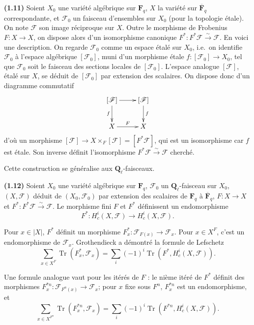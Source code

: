 \documentclass[12pt,a4paper]{amsart}
\theoremstyle{plain}
\theoremstyle{definition}
\theoremstyle{remark}
\DeclareMathOperator{\Tr}{Tr}
\newcommand{\Q}{\mathbf{Q}}
\newcommand{\F}{\mathbf{F}}
\numberwithin{equation}{section}
\begin{document}
\noindent \textbf{(1.11)} Soient $X_0$ une vari\'et\'e alg\'ebrique sur $\F_q$, $X$ la vari\'et\'e sur $\overline{\F}_q$ correspondante, et $\mathscr{F}_0$ un faisceau d'ensembles sur $X_0$ (pour la topologie \'etale). On note $\mathscr{F}$ son image r\'eciproque sur $X$. Outre le morphisme de Frobenius $F:X\to X$, on dispose alors d'un isomorphisme canonique $F^*:F^*\mathscr{F}\xrightarrow{\sim}\mathscr{F}$. En voici une description. On regarde $\mathscr{F}_0$ comme un espace \'etal\'e sur $X_0$, i.e.\ on identifie $\mathscr{F}_0$ \`a l'espace alg\'ebrique $[\mathscr{F}_0]$, muni d'un morphisme \'etale $f:[\mathscr{F}_0]\to X_0$, tel que $\mathscr{F}_0$ soit le faisceau des sections locales de $[\mathscr{F}_0]$. L'espace analogue $[\mathscr{F}]$, \'etal\'e sur $X$, se d\'eduit de $[\mathscr{F}_0]$ par extension des scalaires. On dispose donc d'un diagramme commutatif
\[
\xymatrix{
[\mathscr{F}] \ar[r] \ar[d]_f & [\mathscr{F}] \ar[d]^f \\
X \ar[r]^F & X
}
\]
d'o\`u un morphisme $[\mathscr{F}]\to X\times_F[\mathscr{F}]=[F^*\mathscr{F}]$, qui est un isomorphisme car $f$ est \'etale. Son inverse d\'efinit l'isomorphisme $F^*\mathscr{F}\xrightarrow{\sim}\mathscr{F}$ cherch\'e.

Cette construction se g\'en\'eralise aux $\Q_\ell$-faisceaux.

\noindent \textbf{(1.12)} Soient $X_0$ une vari\'et\'e alg\'ebrique sur $\F_q$, $\mathscr{F}_0$ un $\Q_\ell$-faisceau sur $X_0$, $(X,\mathscr{F})$ d\'eduit de $(X_0,\mathscr{F}_0)$ par extension des scalaires de $\F_q$ \`a $\overline{\F}_q$, $F:X\to X$ et $F^*:F^*\mathscr{F}\xrightarrow{\sim}\mathscr{F}$. Le morphisme fini $F$ et $F^*$ d\'efinissent un endomorphisme
\[
F^*: H^i_c(X,\mathscr{F}) \longrightarrow H^i_c(X,\mathscr{F}).
\]

Pour $x\in|X|$, $F^*$ d\'efinit un morphisme $F^*_x:\mathscr{F}_{F(x)}\to\mathscr{F}_x$. Pour $x\in X^F$, c'est un endomorphisme de $\mathscr{F}_x$. Grothendieck a d\'emontr\'e la formule de Lefschetz
\[
\sum_{x\in X^F} \Tr(F^*_x,\mathscr{F}_x) = \sum_i (-1)^i \Tr(F^*,H^i_c(X,\mathscr{F})).
\]

Une formule analogue vaut pour les it\'er\'es de $F$ : le ni\`eme it\'er\'e de $F^*$ d\'efinit des morphismes $F^{*n}_x:\mathscr{F}_{F^n(x)}\to\mathscr{F}_x$; pour $x$ fixe sous $F^n$, $F^{*n}_x$ est un endomorphisme, et
\begin{equation}\label{eq:1.12.1}
\sum_{x\in X^{F^n}} \Tr(F^{*n}_x,\mathscr{F}_x) = \sum_i (-1)^i \Tr(F^{*n},H^i_c(X,\mathscr{F})).
\end{equation}
\end{document}
